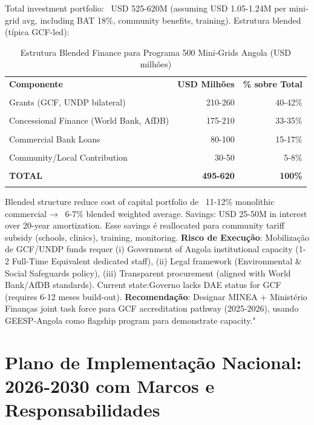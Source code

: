\documentclass[12pt, a4paper]{article}
\begin{document}
Total investment portfolio: ~USD 525-620M (assuming USD 1.05-1.24M per mini-grid avg, including BAT 18\%, community benefits, training). Estrutura blended (típica GCF-led):

\begin{table}[H]
\centering
\caption{Estrutura Blended Finance para Programa 500 Mini-Grids Angola (USD milhões)}
\label{tab:blended_finance}
\begin{tabular}{|l|r|r|}
\hline\textbf{Componente} &\textbf{USD Milhões} &\textbf{\% sobre Total} \\\\
\hline
Grants (GCF, UNDP bilateral) & 210-260 & 40-42\% \\\\
Concessional Finance (World Bank, AfDB) & 175-210 & 33-35\% \\\\
Commercial Bank Loans & 80-100 & 15-17\% \\\\
Community/Local Contribution & 30-50 & 5-8\% \\\\
\hline\textbf{TOTAL} &\textbf{495-620} &\textbf{100\%} \\\\
\hline
\end{tabular}
\end{table}

Blended structure reduce cost of capital portfolio de ~11-12\% monolithic commercial → ~6-7\% blended weighted average. Savings: USD 25-50M in interest over 20-year amortization. Esse savings é reallocated para community tariff subsidy (schools, clinics), training, monitoring.
\textbf{Risco de Execução}: Mobilização de GCF/UNDP funds requer (i) Government of Angola institutional capacity (1-2 Full-Time Equivalent dedicated staff), (ii) Legal framework (Environmental \& Social Safeguards policy), (iii) Transparent procurement (aligned with World Bank/AfDB standards). Current state:Governo lacks DAE status for GCF (requires 6-12 meses build-out).
\textbf{Recomendação}: Designar MINEA + Ministério Finanças joint task force para GCF accreditation pathway (2025-2026), usando GEESP-Angola como flagship program para demonstrate capacity."

\section{Plano de Implementação Nacional: 2026-2030 com Marcos e Responsabilidades}
\end{document}
